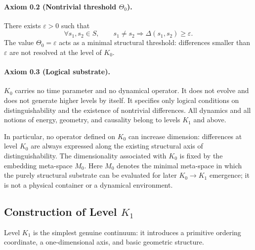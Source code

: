 \paragraph{Axiom 0.2 (Nontrivial threshold \texorpdfstring{$\Theta_0$}{Theta\_0}).}
There exists \(\varepsilon > 0\) such that
\[
    \forall s_1,s_2\in S,\qquad
    s_1 \neq s_2 \Rightarrow \Delta(s_1,s_2) \ge \varepsilon.
\]
The value \(\Theta_0 = \varepsilon\) acts as a minimal structural threshold: differences smaller than \(\varepsilon\) are not resolved at the level of \(K_0\).

\paragraph{Axiom 0.3 (Logical substrate).}
\(K_0\) carries no time parameter and no dynamical operator.
It does not evolve and does not generate higher levels by itself.
It specifies only logical conditions on distinguishability and the existence of nontrivial differences.
All dynamics and all notions of energy, geometry, and causality belong to levels \(K_1\) and above.

In particular, no operator defined on \(K_0\) can increase dimension:
differences at level \(K_0\) are always expressed along the existing structural axis of distinguishability.
The dimensionality associated with \(K_0\) is fixed by the embedding meta-space \(M_0\).
Here \(M_0\) denotes the minimal meta-space in which the purely structural
substrate can be evaluated for later \(K_0\to K_1\) emergence; it is not a
physical container or a dynamical environment.

\subsection{Construction of Level \texorpdfstring{$K_1$}{K\_1}}

Level \(K_1\) is the simplest genuine continuum: it introduces a primitive ordering coordinate, a one-dimensional axis, and basic geometric structure.

